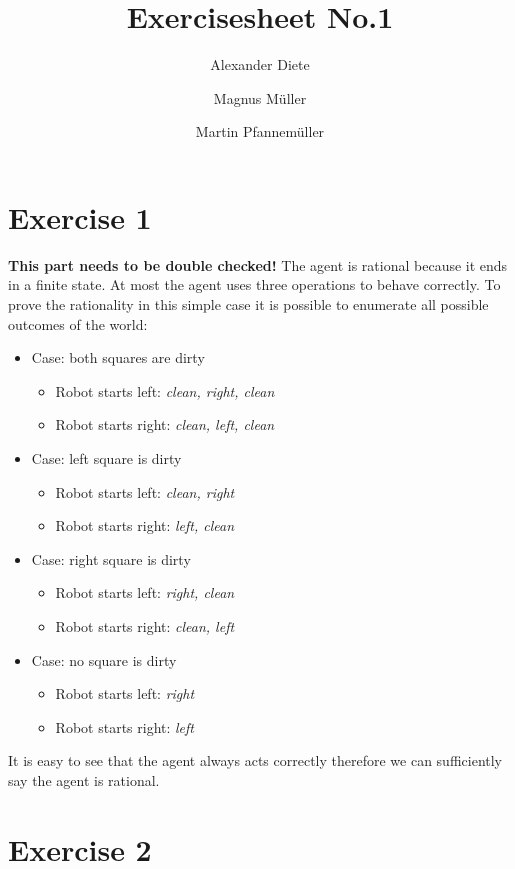 \documentclass[11pt]{article}
\title{Exercisesheet No.1}
\author{Alexander Diete \and Magnus M\"uller \and Martin Pfannem\"uller}
\begin{document}
\maketitle
\section*{Exercise 1}
\textbf{This part needs to be double checked!}
The agent is rational because it ends in a finite state. At most the agent uses three operations to behave correctly. To prove the rationality in this simple case it is possible to enumerate all possible outcomes of the world:

\begin{itemize}
  \item Case: both squares are dirty
  \begin{itemize}
    \item Robot starts left: \textit{clean, right, clean}
    \item Robot starts right: \textit{clean, left, clean} 
  \end{itemize}
  \item Case: left square is dirty
  \begin{itemize}
    \item Robot starts left: \textit{clean, right}
    \item Robot starts right: \textit{left, clean} 
  \end{itemize}
  \item Case: right square is dirty
  \begin{itemize}
    \item Robot starts left: \textit{right, clean}
    \item Robot starts right: \textit{clean, left} 
  \end{itemize}
  \item Case: no square is dirty
  \begin{itemize}
    \item Robot starts left: \textit{right}
    \item Robot starts right: \textit{left} 
  \end{itemize}
\end{itemize}

\noindent
It is easy to see that the agent always acts correctly therefore we can sufficiently say the agent is rational. 

\newpage

\section*{Exercise 2}
\end{document}
